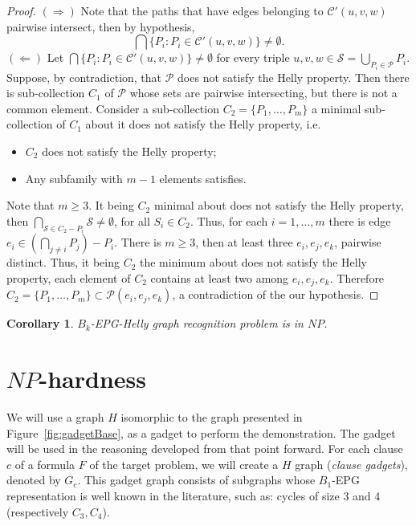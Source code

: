 \documentclass[a4paper,11pt]{article}
\newtheorem{coro}[theorem]{Corollary}
\begin{document}
\begin{proof}
$(\Rightarrow)$ Note that the paths that have edges belonging to $\mathcal{C'}(u, v, w)$ pairwise intersect, then by hypothesis,
$$\bigcap \{P_i: P_i	\in \mathcal{C'}(u,v,w)\} \neq \emptyset .$$
$(\Leftarrow)$ Let $\bigcap \{P_i: P_i	\in \mathcal{C'}(u,v,w)\} \neq \emptyset$  for every triple $ \displaystyle  u,v,w \in \mathcal{S} = \bigcup _{P_i \in \mathcal{P}} P_i$.
Suppose, by contradiction, that $\mathcal{P}$ does not satisfy the Helly property. Then there is sub-collection $C_1$ of $ \mathcal{P}$ whose sets are pairwise intersecting, but there is not a common element. Consider a sub-collection $C_2 = \{P_1, \dots, P_m\}$ a minimal sub-collection of $C_1$ about  it does not satisfy the Helly property, i.e.
\begin{itemize}
\item $C_2$ does not satisfy the Helly property;
\item Any subfamily with $m-1$ elements satisfies.
\end{itemize}
Note that $m\geq 3$. It being $C_2$ minimal about does not satisfy the Helly property, then $\bigcap _{ \mathcal{S} \in C_2-P_i	} \mathcal{S} \neq \emptyset$, for all $S_i \in C_2$. Thus,  for each $i=1, \dots, m$ there is edge $e_i \in (\bigcap _{j\neq i}P_j)-P_i$.
There is $m\geq 3$, then at least three $e_i, e_j, e_k$, pairwise distinct. Thus, it being $C_2$ the minimum about does not satisfy the Helly property, each element of $C_2$ contains at least two among $e_i, e_j, e_k$.  Therefore $C_2 = \{P_1, \dots, P_m\} \subset \mathcal{P}(e_i, e_j, e_k)$, a contradiction of the our hypothesis.
\end{proof}


\begin{coro}
{\sc $B_k$-EPG-Helly graph recognition problem} is in $NP$.
\end{coro}
 



\section{$NP$-hardness}\label{sec:sectionDispositivoClausula}

We will use a graph $H$ isomorphic to the graph presented in Figure~\ref{fig:gadgetBase}, as a gadget to perform the demonstration. The gadget will be used in the reasoning developed from that point forward. For each  clause $c$ of a formula $F$ of the target problem, we will create a $H$ graph (\emph{clause gadgets}), denoted by $G_c$. This gadget graph consists of subgraphs whose $B_1$-EPG representation is well known in the literature, such as: cycles of size 3 and 4 (respectively $ C_3, C_4 $).
\end{document}
